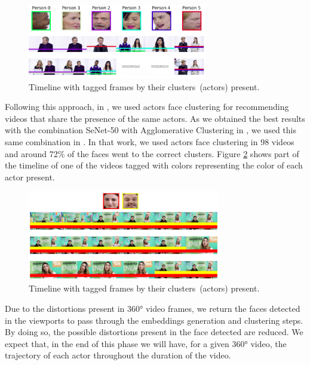 \begin{figure}[!ht]
    \centering
    \includegraphics[width=0.7\textwidth]{img/timeline2.png}
    \caption{Timeline with tagged frames by their clusters~(actors) present.}
    \label{fig:timeline1}
\end{figure}



Following this approach, in \cite{mendes2020ISM}, we used actors face clustering for recommending videos that share the presence of the same actors. As we obtained the best results with the combination SeNet-50 with Agglomerative Clustering in \cite{mendes2020cluster}, we used this same combination in \cite{mendes2020ISM}. 
In that work, we used actors face clustering in 98 videos and around 72\% of the faces went to the correct clusters. Figure \ref{fig:timeline2} shows part of the timeline of one of the videos tagged with colors representing the color of each actor present.

\begin{figure}[!ht]
    \centering
    \includegraphics[width=0.75\textwidth]{img/educational_timeline2.png}
    \caption{Timeline with tagged frames by their clusters~(actors) present.}
    \label{fig:timeline2}
\end{figure}

Due to the distortions present in 360° video frames, we return the faces detected in the viewports to pass through the embeddings generation and clustering steps. By doing so, the possible distortions present in the face detected are reduced. We expect that, in the end of this phase we will have, for a given 360° video, the trajectory of each actor throughout the duration of the video.

